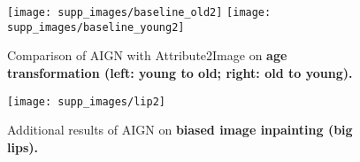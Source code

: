 \documentclass[10pt,twocolumn,letterpaper]{article}
\begin{document}
\begin{figure}[t]
    \centering
    \texttt{[image: supp\_images/baseline\_old2]}
    \texttt{[image: supp\_images/baseline\_young2]}
     \centering
    \caption{Comparison of AIGN with Attribute2Image \cite{DBLP:journals/corr/YanYSL15} on \textbf{age transformation (left: young to old; right: old to young).}}
    \label{fig:baseline-old}
\end{figure}









\begin{figure}[t]
    \centering
    \texttt{[image: supp\_images/lip2]}
     \centering
    \caption{Additional results  of AIGN on \textbf{biased image inpainting (big lips).}}
    \label{fig:more-lips}
\end{figure}










{\small


}
\end{document}
